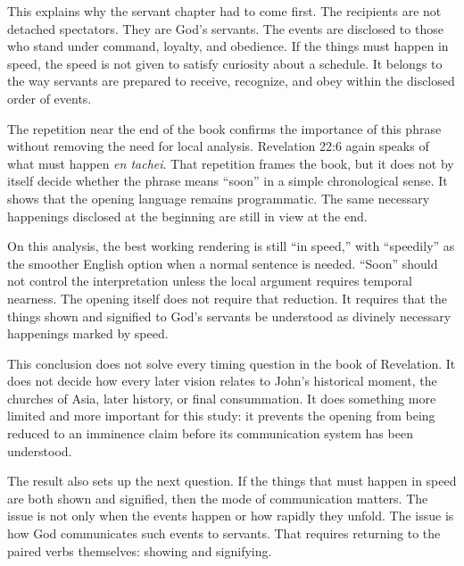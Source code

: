 This explains why the servant chapter had to come first. The recipients are not detached spectators. They are God's servants. The events are disclosed to those who stand under command, loyalty, and obedience. If the things must happen in speed, the speed is not given to satisfy curiosity about a schedule. It belongs to the way servants are prepared to receive, recognize, and obey within the disclosed order of events.

The repetition near the end of the book confirms the importance of this phrase without removing the need for local analysis. Revelation 22:6 again speaks of what must happen \textit{en tachei}. That repetition frames the book, but it does not by itself decide whether the phrase means ``soon'' in a simple chronological sense. It shows that the opening language remains programmatic. The same necessary happenings disclosed at the beginning are still in view at the end.

On this analysis, the best working rendering is still ``in speed,'' with ``speedily'' as the smoother English option when a normal sentence is needed. ``Soon'' should not control the interpretation unless the local argument requires temporal nearness. The opening itself does not require that reduction. It requires that the things shown and signified to God's servants be understood as divinely necessary happenings marked by speed.

This conclusion does not solve every timing question in the book of Revelation. It does not decide how every later vision relates to John's historical moment, the churches of Asia, later history, or final consummation. It does something more limited and more important for this study: it prevents the opening from being reduced to an imminence claim before its communication system has been understood.

The result also sets up the next question. If the things that must happen in speed are both shown and signified, then the mode of communication matters. The issue is not only when the events happen or how rapidly they unfold. The issue is how God communicates such events to servants. That requires returning to the paired verbs themselves: showing and signifying.
